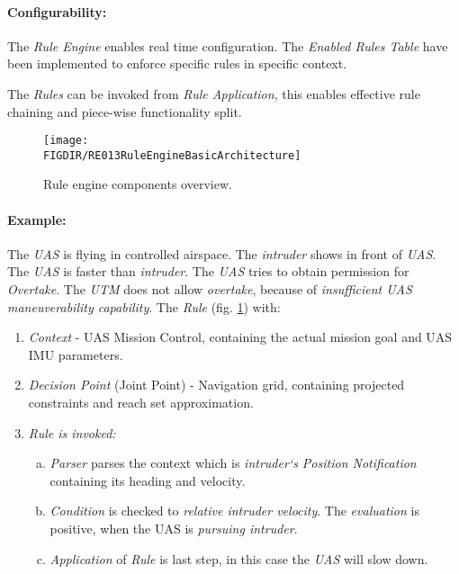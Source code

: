 \paragraph{Configurability:} The \emph{Rule Engine} enables real time configuration. The \emph{Enabled Rules Table} have been implemented to enforce specific rules in specific context. 

The \emph{Rules} can be invoked from \emph{Rule Application}, this enables effective rule chaining and piece-wise functionality split. 

\begin{figure}[H]
    \centering
    \texttt{[image: \\FIGDIR/RE013RuleEngineBasicArchitecture]}
    \caption{Rule engine components overview.}
    \label{fig:RuleEngineBasicArchitecture}
\end{figure}

\paragraph{Example:} The \emph{UAS} is flying in controlled airspace. The \emph{intruder} shows in front of \emph{UAS}. The \emph{UAS} is faster than \emph{intruder}. The \emph{UAS} tries to obtain permission for \emph{Overtake}. The \emph{UTM} does not allow \emph{overtake}, because of \emph{insufficient UAS maneuverability capability}. The \emph{Rule} (fig. \ref{fig:RuleEngineBasicArchitecture}) with:
\begin{enumerate}
    \item \emph{Context} - UAS Mission Control, containing the actual mission goal and UAS IMU parameters. 
    
    \item \emph{Decision Point} (Joint Point) - Navigation grid, containing projected constraints and reach set approximation.
    
    \item \emph{Rule is invoked:}
    \begin{enumerate}[a.]
        \item \emph{Parser} parses the context which is \emph{intruder`s Position Notification} containing its heading and velocity.
        
        \item \emph{Condition} is checked to \emph{relative intruder velocity}. The \emph{evaluation} is positive, when the UAS is \emph{pursuing intruder}.
        
        \item \emph{Application} of \emph{Rule} is last step, in this case the \emph{UAS} will slow down.
    \end{enumerate}
\end{enumerate}